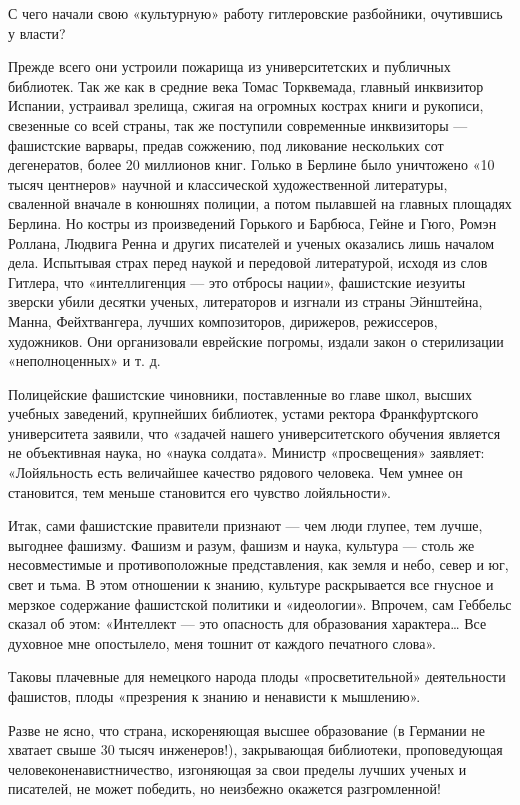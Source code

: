 \documentclass[12pt, a4paper, openany]{book}
\begin{document}
С чего начали свою «культурную» работу гитлеровские разбойники, очутившись у власти?

Прежде всего они устроили пожарища из университетских и публичных библиотек. Так же как в средние века Томас Торквемада, главный инквизитор Испании, устраивал зрелища, сжигая на огромных кострах книги и рукописи, свезенные со всей страны, так же поступили современные инквизиторы — фашистские варвары, предав сожжению, под ликование нескольких сот дегенератов, более 20 миллионов книг. Голько в Берлине было уничтожено «10 тысяч центнеров» научной и классической художественной литературы, сваленной вначале в конюшнях полиции, а потом пылавшей на главных площадях Берлина. Но костры из произведений Горького и Барбюса, Гейне и Гюго, Ромэн Роллана, Людвига Ренна и других писателей и ученых оказались лишь началом дела. Испытывая страх перед наукой и передовой литературой, исходя из слов Гитлера, что «интеллигенция — это отбросы нации», фашистские иезуиты зверски убили десятки ученых, литераторов и изгнали из страны Эйнштейна, Манна, Фейхтвангера, лучших композиторов, дирижеров, режиссеров, художников. Они организовали еврейские погромы, издали закон о стерилизации «неполноценных» и т. д.

Полицейские фашистские чиновники, поставленные во главе школ, высших учебных заведений, крупнейших библиотек, устами ректора Франкфуртского университета заявили, что «задачей нашего университетского обучения является не объективная наука, но «наука солдата». Министр «просвещения» заявляет: «Лойяльность есть величайшее качество рядового человека. Чем умнее он становится, тем меньше становится его чувство лойяльности».

Итак, сами фашистские правители признают — чем люди глупее, тем лучше, выгоднее фашизму. Фашизм и разум, фашизм и наука, культура — столь же несовместимые и противоположные представления, как земля и небо, север и юг, свет и тьма. В этом отношении к знанию, культуре раскрывается все гнусное и мерзкое содержание фашистской политики и «идеологии». Впрочем, сам Геббельс сказал об этом: «Интеллект — это опасность для образования характера… Все духовное мне опостылело, меня тошнит от каждого печатного слова».

Таковы плачевные для немецкого народа плоды «просветительной» деятельности фашистов, плоды «презрения к знанию и ненависти к мышлению».

Разве не ясно, что страна, искореняющая высшее образование (в Германии не хватает свыше 30 тысяч инженеров!), закрывающая библиотеки, проповедующая человеконенавистничество, изгоняющая за свои пределы лучших ученых и писателей, не может победить, но неизбежно окажется разгромленной!
\end{document}
